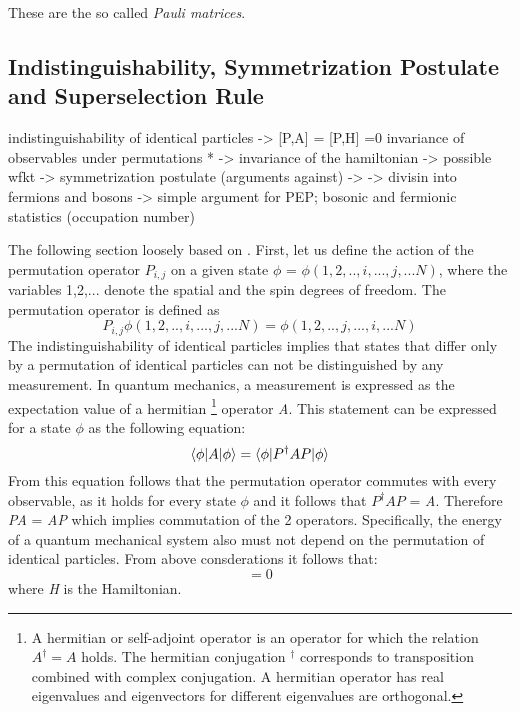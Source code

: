 These are the so called \textit{Pauli matrices}.

\subsection{Indistinguishability, Symmetrization Postulate and Superselection Rule}
\label{sec:IndSymPostSS}

indistinguishability of identical particles -> [P,A] = [P,H] =0 invariance of observables under permutations * -> invariance of the hamiltonian -> possible wfkt -> symmetrization postulate (arguments against) -> -> divisin into fermions and bosons -> simple argument for PEP; bosonic and fermionic statistics (occupation number)

The following section loosely based on \cite{Sperandio2008}. First, let us define the action of the permutation operator $P_{i,j}$ on a given state $\phi$ = $\phi(1,2,..,i,...,j,...N)$, where the variables 1,2,... denote the spatial and the spin degrees of freedom. The permutation operator is defined as
\begin{equation}
 P_{i,j}\phi(1,2,..,i,...,j,...N) = \phi(1,2,..,j,...,i,...N)
\end{equation} 
The indistinguishability of identical particles implies that states that differ only by a permutation of identical particles can not be distinguished by any measurement. In quantum mechanics, a measurement is expressed as the expectation value of a hermitian \footnote{A hermitian or self-adjoint operator is an operator for which the relation $A^{\dag} = A$ holds. The hermitian conjugation $^{\dag}$ corresponds to transposition combined with complex conjugation. A hermitian operator has real eigenvalues and eigenvectors for different eigenvalues are orthogonal.} operator \textit{A}. This statement can be expressed for a state $\phi$ as the following equation:
\begin{equation}
 \braket{\phi|A|\phi} = \braket{\phi|P^{\dag}AP|\phi}
\end{equation} 
From this equation follows that the permutation operator commutes with every observable, as it holds for every state $\phi$ and it follows that $P^{\dag}AP$ = \textit{A}. Therefore \textit{PA} = \textit{AP} which implies commutation of the 2 operators. Specifically, the energy of a quantum mechanical system also must not depend on the permutation of identical particles. From above consderations it follows that:
\begin{equation}
 [P,H] = 0
\end{equation} 
where \textit{H} is the Hamiltonian. 

